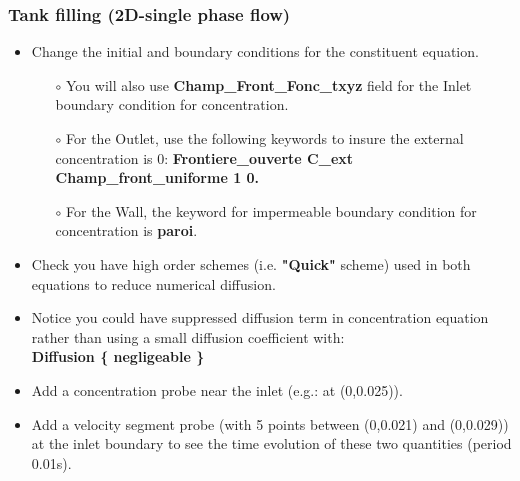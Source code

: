 \documentclass[10pt, hyperref={unicode=true,pdfusetitle, bookmarks=true,bookmarksnumbered=false,bookmarksopen=false, breaklinks=false,pdfborder={0 0 1},backref=true,colorlinks=true,linkcolor=darkblue,pageanchor}]{beamer}
\begin{document}
\begin{frame}
\frametitle{Tank filling (2D-single phase flow)}
\begin{block}{}

\begin{itemize}
\item Change the initial and boundary conditions for the constituent equation. 
    \begin{itemize}
    \item [$\circ$] You will also use \textbf{Champ\_Front\_Fonc\_txyz} field for the Inlet boundary condition for concentration.
    \item [$\circ$] For the Outlet, use the following keywords to insure the external concentration is 0:
                    \textbf{Frontiere\_ouverte C\_ext Champ\_front\_uniforme 1 0.} \\
    \item [$\circ$] For the Wall, the keyword for impermeable boundary condition for concentration is \textbf{paroi}.
    \end{itemize}
\item Check you have high order schemes (i.e. \textbf{"Quick"} scheme) used in both equations to reduce numerical diffusion. 
\item Notice you could have suppressed diffusion term in concentration equation rather than using a small diffusion coefficient with:\\
\textbf{Diffusion \{ negligeable \}}
\item Add a concentration probe near the inlet (e.g.: at (0,0.025)).
\item Add a velocity segment probe (with 5 points between (0,0.021) and (0,0.029)) at the inlet boundary to see the time evolution of these two quantities (period 0.01s).
\end{itemize}

\end{block}
\end{frame}
\end{document}
